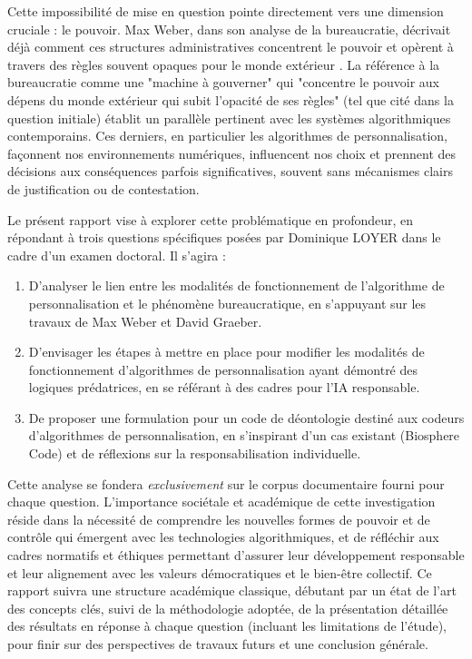 \documentclass[10pt, twocolumn]{article}
\begin{document}
Cette impossibilité de mise en question pointe directement vers une dimension cruciale : le pouvoir. Max Weber, dans son analyse de la bureaucratie, décrivait déjà comment ces structures administratives concentrent le pouvoir et opèrent à travers des règles souvent opaques pour le monde extérieur \citep{Weber1922}. La référence à la bureaucratie comme une "machine à gouverner" qui "concentre le pouvoir aux dépens du monde extérieur qui subit l’opacité de ses règles" (tel que cité dans la question initiale) établit un parallèle pertinent avec les systèmes algorithmiques contemporains. Ces derniers, en particulier les algorithmes de personnalisation, façonnent nos environnements numériques, influencent nos choix et prennent des décisions aux conséquences parfois significatives, souvent sans mécanismes clairs de justification ou de contestation.

Le présent rapport vise à explorer cette problématique en profondeur, en répondant à trois questions spécifiques posées par Dominique LOYER dans le cadre d'un examen doctoral. Il s'agira :
\begin{enumerate}
    \item D'analyser le lien entre les modalités de fonctionnement de l’algorithme de personnalisation et le phénomène bureaucratique, en s'appuyant sur les travaux de Max Weber et David Graeber.
    \item D'envisager les étapes à mettre en place pour modifier les modalités de fonctionnement d'algorithmes de personnalisation ayant démontré des logiques prédatrices, en se référant à des cadres pour l'IA responsable.
    \item De proposer une formulation pour un code de déontologie destiné aux codeurs d'algorithmes de personnalisation, en s'inspirant d'un cas existant (Biosphere Code) et de réflexions sur la responsabilisation individuelle.
\end{enumerate}
Cette analyse se fondera \textit{exclusivement} sur le corpus documentaire fourni pour chaque question. L'importance sociétale et académique de cette investigation réside dans la nécessité de comprendre les nouvelles formes de pouvoir et de contrôle qui émergent avec les technologies algorithmiques, et de réfléchir aux cadres normatifs et éthiques permettant d'assurer leur développement responsable et leur alignement avec les valeurs démocratiques et le bien-être collectif. Ce rapport suivra une structure académique classique, débutant par un état de l'art des concepts clés, suivi de la méthodologie adoptée, de la présentation détaillée des résultats en réponse à chaque question (incluant les limitations de l'étude), pour finir sur des perspectives de travaux futurs et une conclusion générale.
\end{document}
